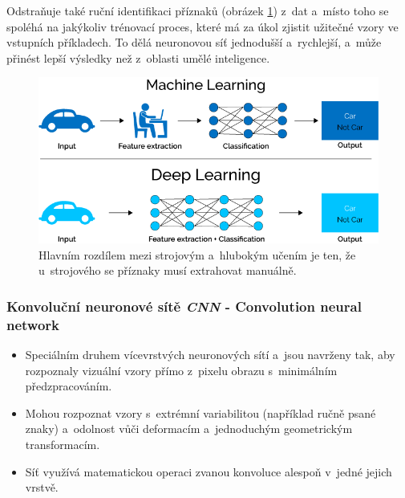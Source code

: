 Odstraňuje také ruční identifikaci příznaků (obrázek \ref{fig:ml_vs_ann}) z~dat a~místo toho se spoléhá na jakýkoliv trénovací proces, které má za úkol zjistit užitečné vzory ve vstupních příkladech. To dělá neuronovou síť jednodušší a~rychlejší, a~může přinést lepší výsledky než z~oblasti umělé inteligence.

\begin{figure}[H]
\centering
\includegraphics[width=.85\linewidth]{assets/9_ml_vs_ann}
\caption{Hlavním rozdílem mezi strojovým a~hlubokým učením je ten, že u~strojového se příznaky musí extrahovat manuálně.}
	\label{fig:ml_vs_ann}
\end{figure}

\subsubsection{Konvoluční neuronové sítě \textit{CNN} - Convolution neural network}
\begin{itemize}
  \item Speciálním druhem vícevrstvých neuronových sítí a~jsou navrženy tak, aby rozpoznaly vizuální vzory přímo z~pixelu obrazu s~minimálním předzpracováním.
  \item Mohou rozpoznat vzory s~extrémní variabilitou (například ručně psané znaky) a~odolnost vůči deformacím a~jednoduchým geometrickým transformacím.
  \item Síť využívá matematickou operaci zvanou konvoluce alespoň v~jedné jejich vrstvě.
\end{itemize}


